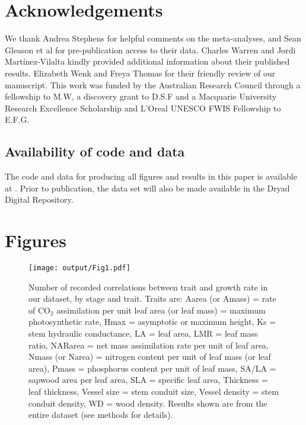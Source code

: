 \documentclass[a4paper,11pt]{article}
\begin{document}
\section*{Acknowledgements}\label{Acknowledgment}

We thank Andrea Stephens for helpful comments on the meta-analyses, and Sean Gleason et al for pre-publication access to their data. Charles Warren and Jordi Mart{\'{i}}nez-Vilalta kindly provided additional information about their published results. Elizabeth Wenk and Freya Thomas for their friendly review of our manuscript. This work was funded by the Australian Research Council through a fellowship to M.W, a discovery grant to D.S.F and a Macquarie University Research Excellence Scholarship and L'Oreal UNESCO FWIS Fellowship to E.F.G.

\subsection*{Availability of code and data}\label{code}

The code and data for producing all figures and results in this paper is available at . Prior to publication, the data set will also be made available in the Dryad Digital Repository.

\linespread{1}
\label{references}

\clearpage
\section*{Figures}

\begin{figure}[h!]
\centering
\texttt{[image: output/Fig1.pdf]}
\caption{Number of recorded correlations between trait and growth rate in our dataset, by stage and trait. Traits are: Aarea (or Amass) = rate of CO$_{2}$ assimilation per unit leaf area (or leaf mass) = maximum photosynthetic rate, Hmax = asymptotic or maximum height, Ks = stem hydraulic conductance, LA = leaf area, LMR = leaf mass ratio, NARarea = net mass assimilation rate per unit of leaf area, Nmass (or Narea) = nitrogen content per unit of leaf mass (or leaf area), Pmass = phosphorus content per unit of leaf mass, SA/LA = sapwood area per leaf area, SLA = specific leaf area, Thickness = leaf thickness, Vessel size = stem conduit size, Vessel density = stem conduit density, WD = wood density. Results shown are from the entire dataset (see methods for details).}
\label{fig:fig1}
\end{figure}
\end{document}

